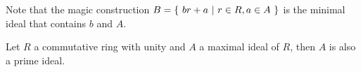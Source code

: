 \documentclass[../main.tex]{subfiles}
\begin{document}
Note that the magic construction $B = \{ \ br + a \ | \  r \in R, a \in A \ \}$
is the minimal ideal that contains $b$ and $A$.
  
\begin{corollary}
  Let $R$ a commutative ring with unity and $A$ a maximal ideal of $R$,
  then $A$ is also a prime ideal.
\end{corollary}
\end{document}
